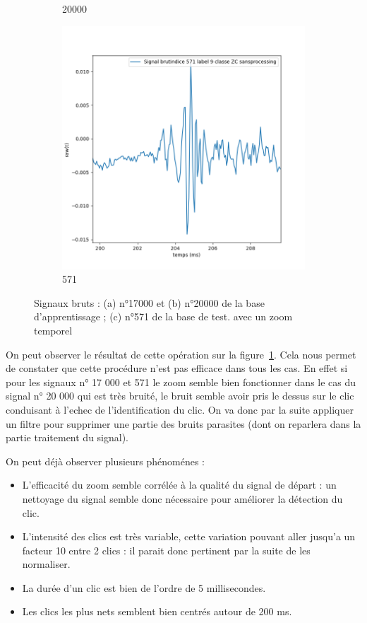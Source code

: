 \begin{figure}[!h]
\begin{subfigure}[b]{0.3\textwidth}
  \caption{20000}
  \end{subfigure}
  \begin{subfigure}[b]{0.3\textwidth}
    \includegraphics[width=\textwidth]{./images/indice571Spectro1Dlabel9classeZCsansprocessingaveczoom.png}
  \caption{571}
  \end{subfigure}
  \caption{Signaux bruts : (a) n°17000 et (b) n°20000 de la base d'apprentissage ; (c) n°571 de la base de test. avec un zoom temporel%
  \label{fig:signauxbrutszoom}}
\end{figure}

On peut observer le résultat de cette opération sur la figure~\ref{fig:signauxbrutszoom}.
Cela nous permet de constater que cette procédure n'est pas efficace dans tous les cas. En effet si pour les signaux n° 17 000 et 571 le zoom semble bien fonctionner dans le cas du signal n° 20 000 qui est très bruité, le bruit semble avoir pris le dessus sur le clic conduisant à l'echec de l'identification du clic.
On va donc par la suite appliquer un filtre pour supprimer une partie des bruits parasites (dont on reparlera dans la partie traitement du signal).

On peut déjà observer plusieurs phénoménes :
\begin{itemize}
\item L'efficacité du zoom semble corrélée à la qualité du signal de départ : un nettoyage du signal semble donc nécessaire pour améliorer la détection du clic.
\item L'intensité des clics est très  variable, cette variation pouvant aller jusqu'a un facteur 10 entre 2 clics : il parait donc pertinent par la suite de les normaliser.
\item La durée d'un clic est bien de l'ordre de 5 millisecondes.
\item Les clics les plus nets semblent bien centrés autour de 200 ms.
\end{itemize}


